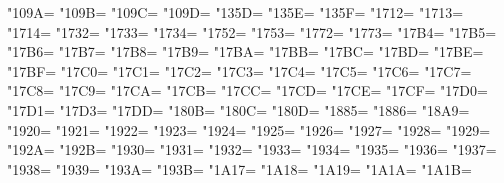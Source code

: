\XeTeXcharclass"109A=\KclassCM
\XeTeXcharclass"109B=\KclassCM
\XeTeXcharclass"109C=\KclassCM
\XeTeXcharclass"109D=\KclassCM
\XeTeXcharclass"135D=\KclassCM
\XeTeXcharclass"135E=\KclassCM
\XeTeXcharclass"135F=\KclassCM
\XeTeXcharclass"1712=\KclassCM
\XeTeXcharclass"1713=\KclassCM
\XeTeXcharclass"1714=\KclassCM
\XeTeXcharclass"1732=\KclassCM
\XeTeXcharclass"1733=\KclassCM
\XeTeXcharclass"1734=\KclassCM
\XeTeXcharclass"1752=\KclassCM
\XeTeXcharclass"1753=\KclassCM
\XeTeXcharclass"1772=\KclassCM
\XeTeXcharclass"1773=\KclassCM
\XeTeXcharclass"17B4=\KclassCM
\XeTeXcharclass"17B5=\KclassCM
\XeTeXcharclass"17B6=\KclassCM
\XeTeXcharclass"17B7=\KclassCM
\XeTeXcharclass"17B8=\KclassCM
\XeTeXcharclass"17B9=\KclassCM
\XeTeXcharclass"17BA=\KclassCM
\XeTeXcharclass"17BB=\KclassCM
\XeTeXcharclass"17BC=\KclassCM
\XeTeXcharclass"17BD=\KclassCM
\XeTeXcharclass"17BE=\KclassCM
\XeTeXcharclass"17BF=\KclassCM
\XeTeXcharclass"17C0=\KclassCM
\XeTeXcharclass"17C1=\KclassCM
\XeTeXcharclass"17C2=\KclassCM
\XeTeXcharclass"17C3=\KclassCM
\XeTeXcharclass"17C4=\KclassCM
\XeTeXcharclass"17C5=\KclassCM
\XeTeXcharclass"17C6=\KclassCM
\XeTeXcharclass"17C7=\KclassCM
\XeTeXcharclass"17C8=\KclassCM
\XeTeXcharclass"17C9=\KclassCM
\XeTeXcharclass"17CA=\KclassCM
\XeTeXcharclass"17CB=\KclassCM
\XeTeXcharclass"17CC=\KclassCM
\XeTeXcharclass"17CD=\KclassCM
\XeTeXcharclass"17CE=\KclassCM
\XeTeXcharclass"17CF=\KclassCM
\XeTeXcharclass"17D0=\KclassCM
\XeTeXcharclass"17D1=\KclassCM
\XeTeXcharclass"17D3=\KclassCM
\XeTeXcharclass"17DD=\KclassCM
\XeTeXcharclass"180B=\KclassCM
\XeTeXcharclass"180C=\KclassCM
\XeTeXcharclass"180D=\KclassCM
\XeTeXcharclass"1885=\KclassCM
\XeTeXcharclass"1886=\KclassCM
\XeTeXcharclass"18A9=\KclassCM
\XeTeXcharclass"1920=\KclassCM
\XeTeXcharclass"1921=\KclassCM
\XeTeXcharclass"1922=\KclassCM
\XeTeXcharclass"1923=\KclassCM
\XeTeXcharclass"1924=\KclassCM
\XeTeXcharclass"1925=\KclassCM
\XeTeXcharclass"1926=\KclassCM
\XeTeXcharclass"1927=\KclassCM
\XeTeXcharclass"1928=\KclassCM
\XeTeXcharclass"1929=\KclassCM
\XeTeXcharclass"192A=\KclassCM
\XeTeXcharclass"192B=\KclassCM
\XeTeXcharclass"1930=\KclassCM
\XeTeXcharclass"1931=\KclassCM
\XeTeXcharclass"1932=\KclassCM
\XeTeXcharclass"1933=\KclassCM
\XeTeXcharclass"1934=\KclassCM
\XeTeXcharclass"1935=\KclassCM
\XeTeXcharclass"1936=\KclassCM
\XeTeXcharclass"1937=\KclassCM
\XeTeXcharclass"1938=\KclassCM
\XeTeXcharclass"1939=\KclassCM
\XeTeXcharclass"193A=\KclassCM
\XeTeXcharclass"193B=\KclassCM
\XeTeXcharclass"1A17=\KclassCM
\XeTeXcharclass"1A18=\KclassCM
\XeTeXcharclass"1A19=\KclassCM
\XeTeXcharclass"1A1A=\KclassCM
\XeTeXcharclass"1A1B=\KclassCM
